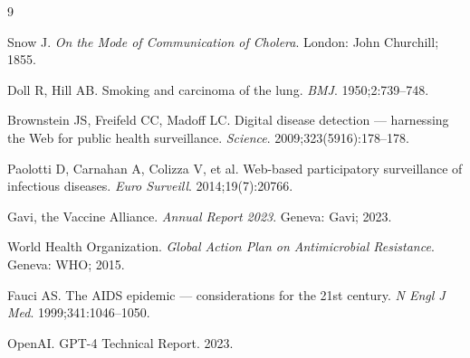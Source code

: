\documentclass[12pt]{article}
\begin{document}
\begin{thebibliography}{9}

Snow J. \textit{On the Mode of Communication of Cholera}. London: John Churchill; 1855.

Doll R, Hill AB. Smoking and carcinoma of the lung. \textit{BMJ}. 1950;2:739--748.

Brownstein JS, Freifeld CC, Madoff LC. Digital disease detection --- harnessing the Web for public health surveillance. \textit{Science}. 2009;323(5916):178--178.

Paolotti D, Carnahan A, Colizza V, et al. Web-based participatory surveillance of infectious diseases. \textit{Euro Surveill}. 2014;19(7):20766.

Gavi, the Vaccine Alliance. \textit{Annual Report 2023}. Geneva: Gavi; 2023.

World Health Organization. \textit{Global Action Plan on Antimicrobial Resistance}. Geneva: WHO; 2015.

Fauci AS. The AIDS epidemic --- considerations for the 21st century. \textit{N Engl J Med}. 1999;341:1046--1050.

OpenAI. GPT-4 Technical Report. 2023.

\end{thebibliography}
\end{document}
